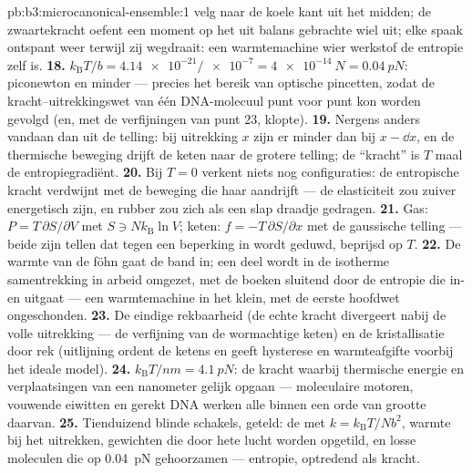 \begin{solution}{pb:b3:microcanonical-ensemble:1}
velg naar de koele kant uit het midden; de zwaartekracht oefent een moment
op het uit balans gebrachte wiel uit; elke spaak ontspant weer terwijl zij
wegdraait: een warmtemachine wier werkstof de entropie zelf is.
\textbf{18.} $k_{\text{B}}T/b = \num{4.14e-21}/\num{e-7} =
\qty{4e-14}{N} = \qty{0.04}{pN}$: piconewton en minder --- precies het
bereik van optische pincetten, zodat de kracht--uitrekkingswet van één
DNA-molecuul punt voor punt kon worden gevolgd (en, met de verfijningen van
punt 23, klopte).
\textbf{19.} Nergens anders vandaan dan uit de telling: bij uitrekking $x$
zijn er minder  dan bij $x - \dd x$, en de thermische
beweging drijft de keten naar de grotere telling; de ``kracht'' is $T$ maal
de entropiegradiënt.
\textbf{20.} Bij $T = 0$ verkent niets nog configuraties: de entropische
kracht verdwijnt met de beweging die haar aandrijft --- de elasticiteit zou
zuiver energetisch zijn, en rubber zou zich als een slap draadje gedragen.
\textbf{21.} Gas: $P = T\,\partial S/\partial V$ met $S \ni
Nk_{\text{B}}\ln V$; keten: $f = -T\,\partial S/\partial x$ met de
gaussische telling --- beide zijn tellen dat tegen een beperking in wordt
geduwd, beprijsd op $T$.
\textbf{22.} De warmte van de föhn gaat de band in; een deel wordt in de
isotherme samentrekking in arbeid omgezet, met de boeken sluitend door de
entropie die in- en uitgaat --- een warmtemachine in het klein, met de
eerste hoofdwet ongeschonden.
\textbf{23.} De eindige rekbaarheid (de echte kracht divergeert nabij de
volle uitrekking --- de verfijning van de wormachtige keten) en de
kristallisatie door rek (uitlijning ordent de ketens en geeft hysterese en
warmteafgifte voorbij het ideale model).
\textbf{24.} $k_{\text{B}}T/\unit{nm} = \qty{4.1}{pN}$: de kracht waarbij
thermische energie en verplaatsingen van een nanometer gelijk opgaan ---
moleculaire motoren, vouwende eiwitten en gerekt DNA werken alle binnen een
orde van grootte daarvan.
\textbf{25.} Tienduizend blinde schakels, geteld: de  met
$k = k_{\text{B}}T/Nb^2$, warmte bij het uitrekken, gewichten die door hete
lucht worden opgetild, en losse moleculen die op \qty{0.04}{pN}
gehoorzamen --- entropie, optredend als kracht.
\end{solution}
